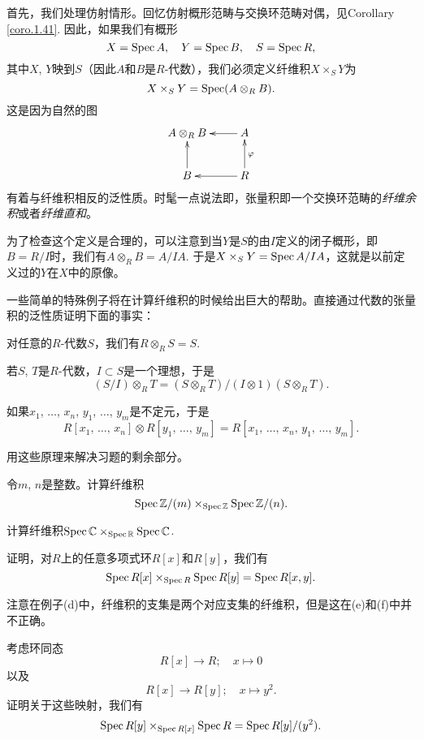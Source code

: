 首先，我们处理仿射情形。回忆仿射概形范畴与交换环范畴对偶，见Corollary \ref{coro.1.41}. 因此，如果我们有概形
\[
	X=\operatorname{Spec} A,\quad Y=\operatorname{Spec} B,\quad S=\operatorname{Spec} R,
\]
其中$X$, $Y$映到$S$（因此$A$和$B$是$R$\hyp 代数），我们必须定义纤维积$X\times_S Y$为
\[
	X\times_S Y=\operatorname{Spec}(A\otimes_R B).
\]
这是因为自然的图
\[
	\xymatrix{
	A\otimes_R B&A\ar[l]\\
	B\ar[u]&R\ar[l]\ar[u]_\varphi
	}
\]
有着与纤维积相反的泛性质。时髦一点说法即，张量积即一个交换环范畴的\textit{纤维余积}或者\textit{纤维直和}。

为了检查这个定义是合理的，可以注意到当$Y$是$S$的由$I$定义的闭子概形，即$B=R/I$时，我们有$A\otimes_R B=A/IA$. 于是$X\times_S Y=\operatorname{Spec} A/IA$，这就是以前定义过的$Y$在$X$中的原像。

\begin{exe}
一些简单的特殊例子将在计算纤维积的时候给出巨大的帮助。直接通过代数的张量积的泛性质证明下面的事实：

\begin{compactenum}[(a)]
\item 对任意的$R$\hyp 代数$S$，我们有$R\otimes_R S=S$.
\item 若$S$, $T$是$R$\hyp 代数，$I\subset S$是一个理想，于是
\[
	(S/I)\otimes_R T=(S\otimes_R T)/(I\otimes 1)(S\otimes_R T).
\]
\item 如果$x_1$, $\dots$, $x_n$, $y_1$, $\dots$, $y_m$是不定元，于是
\[
	R[\text{$x_1$, $\dots$, $x_n$}]\otimes R[\text{$y_1$, $\dots$, $y_m$}]=R[\text{$x_1$, $\dots$, $x_n$, $y_1$, $\dots$, $y_m$}].
\]
\end{compactenum}
用这些原理来解决习题的剩余部分。
\begin{compactenum}[(a)] \setcounter{enumi}{3}
\item 令$m$, $n$是整数。计算纤维积
\[
	\operatorname{Spec} \mathbb{Z}/(m)\times_{\operatorname{Spec} \mathbb{Z}} \operatorname{Spec} \mathbb{Z}/(n).
\]
\item 计算纤维积$\operatorname{Spec} \mathbb{C} \times_{\operatorname{Spec} \mathbb{R}} \operatorname{Spec} \mathbb{C}$.
\item 证明，对$R$上的任意多项式环$R[x]$和$R[y]$，我们有
\[
	\operatorname{Spec} R[x]\times_{\operatorname{Spec} R}\operatorname{Spec} R[y]=\operatorname{Spec} R[x,y].
\]
\end{compactenum}
注意在例子(d)中，纤维积的支集是两个对应支集的纤维积，但是这在(e)和(f)中并不正确。
\begin{compactenum}[(a)] \setcounter{enumi}{6}
\item 考虑环同态
\[
	R[x]\to R;\quad x\mapsto 0
\]
以及
\[
	R[x]\to R[y];\quad x\mapsto y^2.
\]
证明关于这些映射，我们有
\[
	\operatorname{Spec} R[y]\times_{\operatorname{Spec} R[x]}\operatorname{Spec} R=\operatorname{Spec} R[y]/(y^2).
\]
\end{compactenum}
\end{exe}

